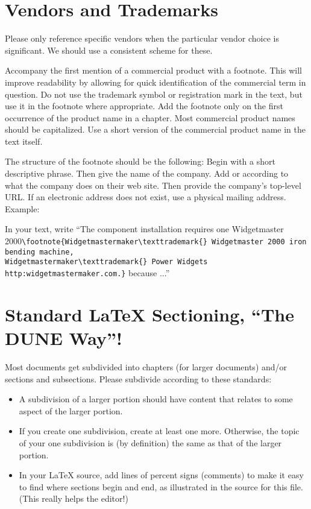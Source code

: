 \section{Vendors and Trademarks}
\label{sec:trademarks}

Please only reference specific vendors when the particular vendor choice is significant. 
We should use a consistent scheme for these. 
 
Accompany the first mention of a commercial product with a footnote.  This will improve readability by allowing for quick identification of the commercial term in question. 
Do not use the trademark symbol \texttrademark{} or registration mark \textregistered{} in the text, but use it in the footnote where appropriate. Add the footnote only on the first occurrence of the product name in a chapter.
Most commercial product names should be capitalized.
Use a short version of the commercial product name in the text itself.
 
The structure of the footnote should be the following:
Begin with a short descriptive phrase.  Then give the name of the company.  Add \texttrademark{} or  \textregistered{} according to what the company does on their web site. Then provide the company's top-level URL. If an electronic address does not exist, use a physical mailing address. Example:

In your text, write ``The component installation requires one Widgetmaster \\
2000\verb|\footnote{Widgetmastermaker\texttrademark{} Widgetmaster 2000 iron bending machine, | \\
\verb|Widgetmastermaker\texttrademark{} Power Widgets http:widgetmastermaker.com.}| because ...''

\section{Standard \LaTeX{} Sectioning, ``The DUNE Way''!}
\label{sec:latex-sectioning}

Most documents get subdivided into chapters (for larger documents) and/or sections and subsections. Please subdivide according to these standards:

\begin{itemize}
\item A subdivision of a larger portion should have content that relates to some aspect of the larger portion. 
\item  If you create one subdivision, create at least one more. Otherwise, the topic of your one subdivision is (by definition) the same as that of the larger portion.
\item In your \LaTeX{} source, add lines of percent signs (comments) to make it easy to find where sections begin and end, as illustrated in the source for this file. (This really helps the editor!)
\end{itemize}

